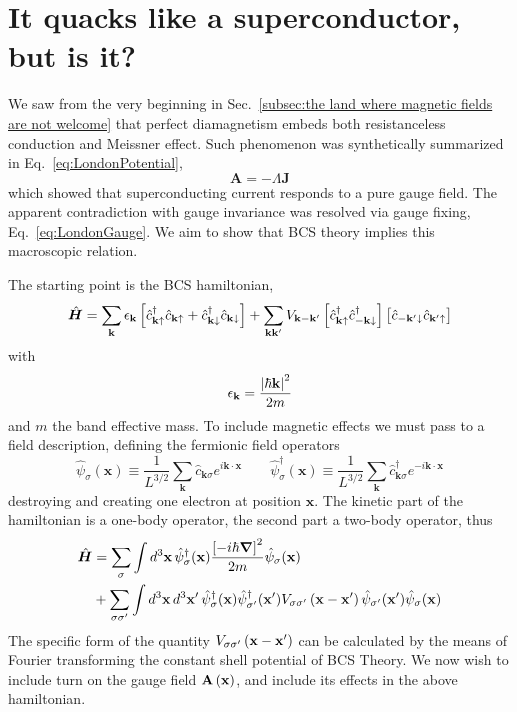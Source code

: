 \section{It quacks like a superconductor, but is it?}\label{sec:it quacks like a superconductor but is it}

We saw from the very beginning in Sec.~\ref{subsec:the land where magnetic fields are not welcome} that perfect diamagnetism embeds both resistanceless conduction and Meissner effect. Such phenomenon was synthetically summarized in Eq.~\ref{eq:LondonPotential},
\[
	\mathbf{A} = - \Lambda \mathbf{J}
\]
which showed that superconducting current responds to a pure gauge field. The apparent contradiction with gauge invariance was resolved via gauge fixing, Eq.~\eqref{eq:LondonGauge}. We aim to show that BCS theory implies this macroscopic relation.

The starting point is the BCS hamiltonian,
\[
	\hat{\bm H} = \sum_{\mathbf{k}} \epsilon_{\mathbf{k}} \left[{\hat{c}_{\mathbf{k}\uparrow}^\dagger \hat{c}_{\mathbf{k}\uparrow} + \hat{c}_{\mathbf{k}\downarrow}^\dagger \hat{c}_{\mathbf{k}\downarrow}}\right] + \sum_{\mathbf{k}\mathbf{k}'} V_{\mathbf{k}-\mathbf{k}'} \left[{\hat{c}_{\mathbf{k}\uparrow}^\dagger \hat{c}_{-\mathbf{k}\downarrow}^\dagger}\right] \left[{\vphantom{c^\dagger} \hat{c}_{-\mathbf{k}'\downarrow} \hat{c}_{\mathbf{k}'\uparrow}}\right]
\]
with
\[
	\epsilon_{\mathbf{k}} = \frac{\abs{\hbar\mathbf{k}}^2}{2m}
\]
and $m$ the band effective mass. To include magnetic effects we must pass to a field description, defining the fermionic field operators
\[
	\hat{\psi}_\sigma (\mathbf{x}) \equiv \frac{1}{L^{3/2}} \sum_\mathbf{k}  \hat{c}_{\mathbf{k}\sigma} e^{i\mathbf{k} \cdot \mathbf{x}}
	\qquad
	\hat{\psi}_\sigma^\dagger (\mathbf{x}) \equiv \frac{1}{L^{3/2}} \sum_\mathbf{k}  \hat{c}_{\mathbf{k}\sigma}^\dagger e^{-i\mathbf{k} \cdot \mathbf{x}}
\]
destroying and creating one electron at position $\mathbf{x}$. The kinetic part of the hamiltonian is a one-body operator, the second part a two-body operator, thus
\begin{equation}\label{eq:bcs hamiltonian second quantization fields}
\begin{aligned}
	\hat{\bm H} &= \sum_\sigma \int d^3 \mathbf{x} \, \hat{\psi}_\sigma^\dagger (\mathbf{x}) \frac{\left[{-i\hbar\grad}\right]^2}{2m} \hat{\psi}_\sigma (\mathbf{x}) \\
	&+ \sum_{\sigma\sigma'} \int d^3 \mathbf{x} \, d^3 \mathbf{x}' \, \hat{\psi}_\sigma^\dagger (\mathbf{x}) \hat{\psi}_{\sigma'}^\dagger (\mathbf{x}') V_{\sigma\sigma'} \left({\mathbf{x} - \mathbf{x}'}\right) \hat{\psi}_{\sigma'} (\mathbf{x}') \hat{\psi}_\sigma (\mathbf{x}) 
\end{aligned}
\end{equation}
The specific form of the quantity $V_{\sigma\sigma'} \left({\mathbf{x} - \mathbf{x}'}\right)$ can be calculated by the means of Fourier transforming the constant shell potential of BCS Theory. We now wish to include turn on the gauge field $\mathbf{A}\left({\mathbf{x}}\right)$, and include its effects in the above hamiltonian.

